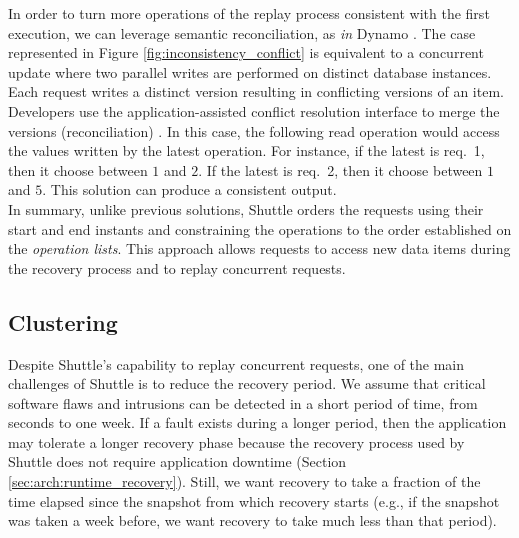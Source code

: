 In order to turn more operations of the replay process consistent with the first execution, we can leverage semantic reconciliation, as \textit{in} Dynamo \cite{Decandia2007}. The case represented in Figure \ref{fig:inconsistency_conflict} is equivalent to a concurrent update where two parallel writes are performed on distinct database instances. Each request writes a distinct version resulting in conflicting versions of an item. Developers use the application-assisted conflict resolution interface to merge the versions (reconciliation) \cite{Decandia2007}. In this case, the following read operation would access the values written by the latest operation. For instance, if the latest is {req.~1}, then it choose between $1$ and $2$. If the latest is {req.~2}, then it choose between $1$ and $5$. This solution can produce a consistent output.\\

In summary, unlike previous solutions, Shuttle orders the requests using their start and end instants and constraining the operations to the order established on the \textit{operation lists}. This approach allows requests to access new data items during the recovery process and to replay concurrent requests.





\subsection{Clustering}
\label{sec:arch:clustering}

Despite Shuttle's capability to replay concurrent requests, one of the main challenges of Shuttle is to reduce the recovery period. We assume that critical software flaws and intrusions can be detected in a short period of time, from seconds to one week. If a fault exists during a longer period, then the application may tolerate a longer recovery phase because the recovery process used by Shuttle does not require application downtime (Section \ref{sec:arch:runtime_recovery}). Still, we want recovery to take a fraction of the time elapsed since the snapshot from which recovery starts (e.g., if the snapshot was taken a week before, we want recovery to take much less than that period).  

